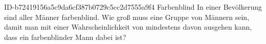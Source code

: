 \begin{exercise}
      {ID-b72419156a5c9da6cf387b0729c5cc2d7555a9f4}
      {Farbenblind}
  \ifproblem\problem
    In einer Bevölkerung sind  aller Männer farbenblind. Wie groß muss
    eine Gruppe von Männern sein, damit man mit einer Wahrscheinlichkeit von
    mindestens  davon ausgehen kann, dass ein farbenblinder Mann dabei ist?
  \fi
\end{exercise}
